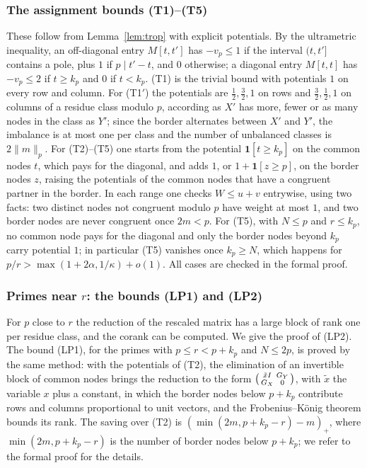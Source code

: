 \documentclass[11pt]{amsart}
\theoremstyle{definition}
\theoremstyle{remark}
\numberwithin{equation}{section}
\begin{document}
\subsubsection{The assignment bounds (T1)--(T5)}\label{sssec:trop}
These follow from Lemma~\ref{lem:trop} with explicit potentials. By the ultrametric inequality, an off-diagonal entry
$M[t,t']$ has $-v_p\le1$ if the interval $(t,t']$ contains a pole, plus $1$ if $p\mid t'-t$, and $0$ otherwise; a diagonal
entry $M[t,t]$ has $-v_p\le2$ if $t\ge k_p$ and $0$ if $t<k_p$. (T1) is the trivial bound with potentials $1$ on every
row and column. For (T1$'$) the potentials are $\frac12,\frac32,1$ on rows and $\frac32,\frac12,1$ on columns of a residue
class modulo $p$, according as $X'$ has more, fewer or as many nodes in the class as $Y'$; since the border alternates
between $X'$ and $Y'$, the imbalance is at most one per class and the number of unbalanced classes is $2\|m\|_p$. For
(T2)--(T5) one starts from the potential $\mathbf 1[t\ge k_p]$ on the common nodes $t$, which pays for the diagonal, and adds
$1$, or $1+\mathbf 1[z\ge p]$, on the border nodes $z$, raising the potentials of the common nodes that have a congruent
partner in the border. In each range one checks $W\le u+v$ entrywise, using two facts: two distinct nodes not
congruent modulo $p$ have weight at most $1$, and two border nodes are never congruent once $2m<p$. For (T5), with
$N\le p$ and $r\le k_p$, no common node pays for the diagonal and only the border nodes beyond $k_p$ carry potential
$1$; in particular (T5) vanishes once $k_p\ge N$, which happens for $p/r>\max(1+2\alpha,1/\kappa)+o(1)$. All cases are
checked in the formal proof.

\subsubsection{Primes near $r$: the bounds (LP1) and (LP2)}\label{sssec:lp}
For $p$ close to $r$ the reduction of the rescaled matrix has a large block of rank one per residue class, and the
corank can be computed. We give the proof of (LP2). The bound (LP1), for the primes with $p\le r<p+k_p$ and $N\le2p$, is
proved by the same method: with the potentials of (T2), the elimination of an invertible block of common nodes brings the
reduction to the form $\begin{psmallmatrix}\tilde xI&G_Y\\ G_X&0\end{psmallmatrix}$, with $\tilde x$ the variable $x$ plus a
constant, in which the border nodes below $p+k_p$
contribute rows and columns proportional to unit vectors, and the Frobenius--K\"onig theorem bounds its rank. The saving over
(T2) is $(\min(2m,p+k_p-r)-m)_+$, where $\min(2m,p+k_p-r)$ is the number of border nodes below $p+k_p$; we refer to the
formal proof for the details.
\end{document}
